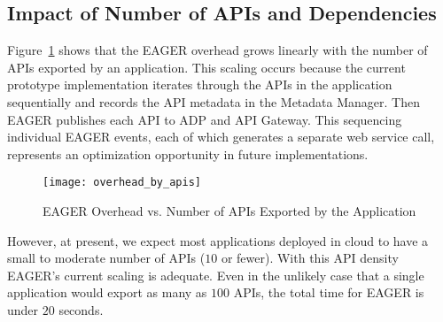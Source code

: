 
\subsection{Impact of Number of APIs and Dependencies}

Figure~\ref{fig:overhead_by_apis} shows that the EAGER overhead grows linearly
with the number of APIs exported by an application.  This scaling occurs
because the current prototype implementation iterates through the APIs in the
application sequentially and records the API metadata in the Metadata Manager.
Then EAGER publishes each API to ADP and API Gateway. This sequencing
individual EAGER events, each of which generates a separate web service call,
represents an optimization opportunity in future implementations.

\begin{figure}
\centering
\texttt{[image: overhead\_by\_apis]}
\caption{EAGER Overhead vs. Number of APIs Exported by the Application}
\label{fig:overhead_by_apis}
\end{figure}

However, at present, we expect 
most applications deployed in cloud to have a small to moderate number of 
APIs ($10$ or fewer).  With this API density EAGER's current scaling is
adequate.
Even in the
unlikely case that a single application would export as many as $100$ APIs,
the total time for EAGER is under $20$ seconds.


